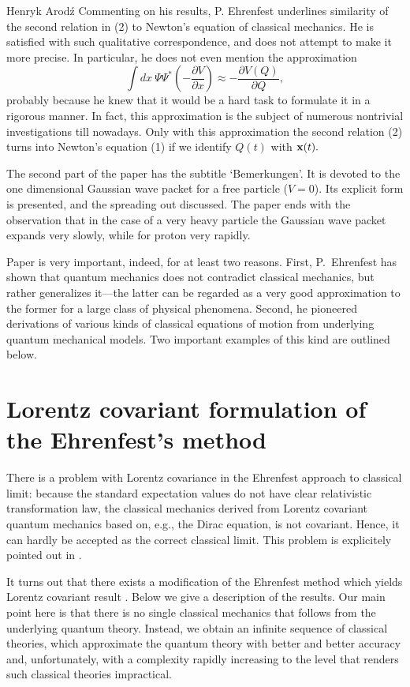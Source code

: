 \begin{artengenv}{Henryk Arod\'z}
Commenting on his results, P. Ehrenfest underlines similarity of the second relation in (2) to Newton's equation of classical mechanics. He is satisfied with such qualitative correspondence, and does not attempt to make it more precise. In particular, he does not even mention the approximation
\[ \int \! dx \:\Psi \Psi^* (- \frac{\partial V}{\partial x}) \approx - \frac{\partial V(Q)}{\partial Q}, \]
probably because he knew that it would be a hard task to formulate it in a rigorous manner. In fact, this approximation is the subject of numerous nontrivial investigations till nowadays. Only with this approximation the second relation (2) turns into Newton's equation (1) 
if we identify $ Q(t)$ with ${\bf x}(t).$ 


The second part of the paper has the subtitle `Bemerkungen'. It is devoted to the one dimensional Gaussian wave packet for a free particle ($V=0$). Its explicit form is presented, and the spreading out discussed. The paper ends with the observation that in the case of a very heavy particle the Gaussian wave packet expands very slowly, while for proton very rapidly. 

Paper \parencite{ehr} is very important, indeed, for at least two reasons. First, P.~Ehrenfest has shown that quantum mechanics does not contradict classical mechanics, but rather generalizes it---the latter can be regarded as a very good approximation to the former for a large class of physical phenomena. 
Second, he pioneered derivations of various kinds of classical equations of motion from underlying quantum mechanical models. Two important examples of this kind are outlined below. 





\section{Lorentz covariant formulation of the Ehrenfest's method }

There is a problem with Lorentz covariance in the Ehrenfest approach to classical limit: because the standard expectation values do not have clear relativistic transformation law, the classical mechanics derived from Lorentz covariant quantum mechanics based on, e.g., the Dirac equation, is not covariant. Hence, it can hardly be accepted as the correct classical limit. This problem is explicitely pointed out in \parencite{HilWou}. 

It turns out that there exists a modification of the Ehrenfest method which yields Lorentz covariant result \parencite{aro1}. Below we give a description of the results. Our main point here is that there is no single classical mechanics that follows from the underlying quantum theory. Instead, we obtain an infinite sequence of classical theories, which approximate the quantum theory with better and better accuracy and, unfortunately, with a complexity rapidly increasing to the level that renders such classical theories impractical. 




\end{artengenv}
